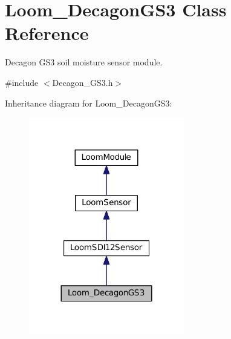\hypertarget{class_loom___decagon_g_s3}{}\section{Loom\+\_\+\+Decagon\+G\+S3 Class Reference}
\label{class_loom___decagon_g_s3}


Decagon G\+S3 soil moisture sensor module.  




{\ttfamily \#include $<$Decagon\+\_\+\+G\+S3.\+h$>$}



Inheritance diagram for Loom\+\_\+\+Decagon\+G\+S3\+:\nopagebreak
\begin{figure}[H]
\begin{center}
\leavevmode
\includegraphics[width=192pt]{class_loom___decagon_g_s3__inherit__graph}
\end{center}
\end{figure}
